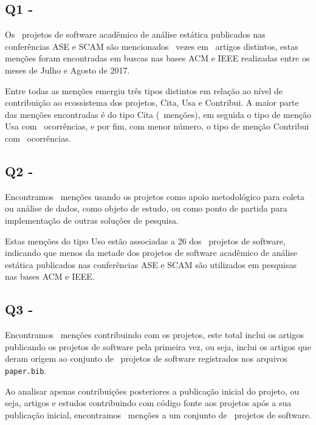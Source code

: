 \subsection{Q1 - \EstudoDoisQuestaoUm}

Os \SoftwareCount \ projetos de software acadêmico de análise estática
publicados nas conferências ASE e SCAM são mencionados \ScreeningCount \ vezes
em \ScreeningUniqueCount \ artigos distintos, estas menções foram encontradas
em buscas nas bases ACM e IEEE realizadas entre os meses de Julho e Agosto de
2017.

Entre todas as menções emergiu três tipos distintos em relação ao nível de
contribuição ao ecossistema dos projetos, Cita, Usa e Contribui. A maior parte
das menções encontradas é do tipo Cita (\CiteCount \ menções), em seguida
o tipo de menção Usa com \UseCount \ ocorrências, e por fim, com menor número,
o tipo de menção Contribui com \ContributeCount \ ocorrências.

\subsection{Q2 - \EstudoDoisQuestaoDois}

Encontramos \UseCount \ menções usando os projetos como apoio metodológico para
coleta ou análise de dados, como objeto de estudo, ou como ponto de partida
para implementação de outras soluções de pesquisa.

Estas menções do tipo Uso estão associadas a 26 dos \SoftwareCount \ projetos
de software, indicando que menos da metade dos projetos de software acadêmico
de análise estática publicados nas conferências ASE e SCAM são utilizados em
pesquisas nas bases ACM e IEEE.

\subsection{Q3 - \EstudoDoisQuestaoTres}

Encontramos \ContributeCount \ menções contribuindo com os projetos, este total
inclui os artigos publicando os projetos de software pela primeira vez, ou
seja, inclui os artigos que deram origem ao conjunto de \SoftwareCount \
projetos de software registrados nos arquivos \texttt{paper.bib}.

Ao analisar apenas contribuições posteriores a publicação inicial
do projeto, ou seja, artigos e estudos contribuindo com código
fonte aos projetos após a sua publicação inicial, encontramos
\ContributeStudyDoisCount \ menções a um conjunto de
\ContributeStudyDoisSoftware \ projetos de software.

